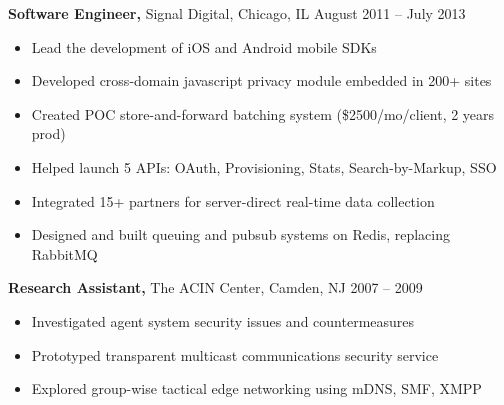 \documentclass[margin]{res}
\begin{document}
\begin{resume}
 {\bf Software Engineer,} Signal Digital, Chicago, IL \hfill August 2011 -- July 2013
 \begin{itemize} \itemsep -2pt  %
  \item Lead the development of iOS and Android mobile SDKs
  \item Developed cross-domain javascript privacy module embedded in 200+ sites
  \item Created POC store-and-forward batching system (\$2500/mo/client, 2 years prod)
  \item Helped launch 5 APIs: OAuth, Provisioning, Stats, Search-by-Markup, SSO
  \item Integrated 15+ partners for server-direct real-time data collection
  \item Designed and built queuing and pubsub systems on Redis, replacing RabbitMQ
 \end{itemize}


 {\bf Research Assistant,} The ACIN Center, Camden, NJ \hfill 2007 -- 2009
 \begin{itemize} \itemsep -2pt  %
 \item Investigated agent system security issues and countermeasures 
 \item Prototyped transparent multicast communications security service 
\item Explored group-wise tactical edge networking using mDNS, SMF, XMPP 
 \end{itemize}



\end{resume}
\end{document}
